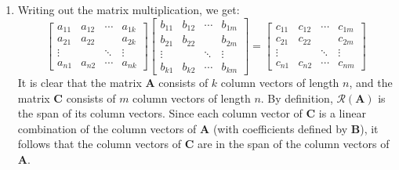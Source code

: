 \begin{enumerate}[label=(\alph*)]
\begin{enumerate}[label=\roman*.]
		      \item Writing out the matrix multiplication, we get:
		            $$
			            \left[\begin{array}{cccc}
					            a_{11}  & a_{12} & \cdots & a_{1 k} \\
					            a_{21}  & a_{22} &        & a_{2 k} \\
					            \vdots  &        & \ddots & \vdots  \\
					            a_{n 1} & a_{n2} & \cdots & a_{n k}
				            \end{array}\right]
			            \left[\begin{array}{cccc}
					            b_{11}  & b_{12}  & \cdots & b_{1 m} \\
					            b_{21}  & b_{22}  &        & b_{2 m} \\
					            \vdots  &         & \ddots & \vdots  \\
					            b_{k 1} & b_{k 2} & \cdots & b_{k m}
				            \end{array}\right]=
			            \left[\begin{array}{cccc}
					            c_{11}  & c_{12}  & \cdots & c_{1 m} \\
					            c_{21}  & c_{22}  &        & c_{2 m} \\
					            \vdots  &         & \ddots & \vdots  \\
					            c_{n 1} & c_{n 2} & \cdots & c_{n m}
				            \end{array}\right]
		            $$
		            It is clear that the matrix $\mathbf{A}$ consists of $k$ column
		            vectors of length $n$, and the matrix $\mathbf{C}$ consists of $m$
		            column vectors of length $n$. By
		            definition, $\mathcal{R}(\mathbf{A})$ is the span of its column
		            vectors. Since each column vector of $\mathbf{C}$ is a linear
		            combination of the column vectors of $\mathbf{A}$ (with coefficients
		            defined by $\mathbf{B}$), it follows that
		            the column vectors of $\mathbf{C}$ are in the span of the column
		            vectors of $\mathbf{A}$.


\end{enumerate}
\end{enumerate}
